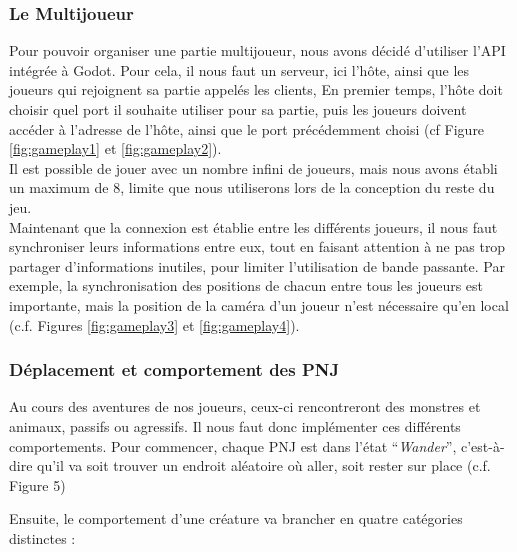 

\subsubsection{Le Multijoueur}

Pour pouvoir organiser une partie multijoueur, nous avons décidé d'utiliser l'API intégrée à Godot.
Pour cela, il nous faut un serveur, ici l'hôte, ainsi que les joueurs qui rejoignent sa partie appelés les clients,
En premier temps, l'hôte doit choisir quel port il souhaite utiliser pour sa partie, puis les joueurs doivent accéder à l'adresse de l'hôte, ainsi que le port précédemment choisi (cf Figure \ref{fig:gameplay1} et \ref*{fig:gameplay2}).
\\

Il est possible de jouer avec un nombre infini de joueurs, mais nous avons établi un maximum de 8, limite que nous utiliserons lors de la conception du reste du jeu.
\\

Maintenant que la connexion est établie entre les différents joueurs, il nous faut synchroniser leurs informations entre eux, tout en faisant attention à ne pas trop partager d'informations inutiles, pour limiter l'utilisation de bande passante.
Par exemple, la synchronisation des positions de chacun entre tous les joueurs est importante, mais la position de la caméra d'un joueur n'est nécessaire qu'en local (c.f. Figures \ref*{fig:gameplay3} et \ref*{fig:gameplay4}).

\subsubsection*{Déplacement et comportement des PNJ}

Au cours des aventures de nos joueurs, ceux-ci rencontreront des monstres et animaux, passifs ou agressifs.
Il nous faut donc implémenter ces différents comportements.
Pour commencer, chaque PNJ est dans l'état “\textit{Wander}”, c'est-à-dire qu'il va soit trouver un endroit aléatoire où aller, soit rester sur place (c.f. Figure 5)

Ensuite, le comportement d'une créature va brancher en quatre catégories distinctes :


